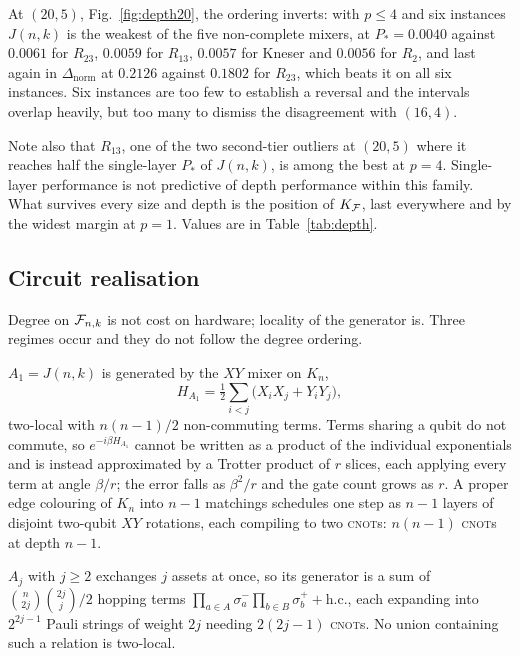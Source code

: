 At $(20,5)$, Fig.~\ref{fig:depth20}, the ordering inverts: with $p\le4$ and six instances $J(n,k)$ is the weakest of the five non-complete mixers, at $P_*=0.0040$ against $0.0061$ for $R_{23}$, $0.0059$ for $R_{13}$, $0.0057$ for Kneser and $0.0056$ for $R_2$, and last again in $\Delta_{\mathrm{norm}}$ at $0.2126$ against $0.1802$ for $R_{23}$, which beats it on all six instances. Six instances are too few to establish a reversal and the intervals overlap heavily, but too many to dismiss the disagreement with $(16,4)$.

Note also that $R_{13}$, one of the two second-tier outliers at $(20,5)$ where it reaches half the single-layer $P_*$ of $J(n,k)$, is among the best at $p=4$. Single-layer performance is not predictive of depth performance within this family. What survives every size and depth is the position of $K_{\mathcal{F}}$, last everywhere and by the widest margin at $p=1$. Values are in Table~\ref{tab:depth}.

\subsection{\label{sec:circuits}Circuit realisation}
Degree on $\mathcal{F}_{n,k}$ is not cost on hardware; locality of the generator is. Three regimes occur and they do not follow the degree ordering.

$A_1=J(n,k)$ is generated by the $XY$ mixer on $K_n$,
\begin{equation}
H_{A_1}=\tfrac12\sum_{i<j}\bigl(X_iX_j+Y_iY_j\bigr),
    \label{eq:xy-mixer}
\end{equation}
two-local with $n(n-1)/2$ non-commuting terms. Terms sharing a qubit do not commute, so $e^{-i\beta H_{A_1}}$ cannot be written as a product of the individual exponentials and is instead approximated by a Trotter product of $r$ slices, each applying every term at angle $\beta/r$; the error falls as $\beta^{2}/r$ and the gate count grows as $r$. A proper edge colouring of $K_n$ into $n-1$ matchings schedules one step as $n-1$ layers of disjoint two-qubit $XY$ rotations, each compiling to two \textsc{cnot}s: $n(n-1)$ \textsc{cnot}s at depth $n-1$.

$A_j$ with $j\ge2$ exchanges $j$ assets at once, so its generator is a sum of $\binom{n}{2j}\binom{2j}{j}/2$ hopping terms $\prod_{a\in A}\sigma^-_a\prod_{b\in B}\sigma^+_b+\mathrm{h.c.}$, each expanding into $2^{2j-1}$ Pauli strings of weight $2j$ needing $2(2j-1)$ \textsc{cnot}s. No union containing such a relation is two-local.

